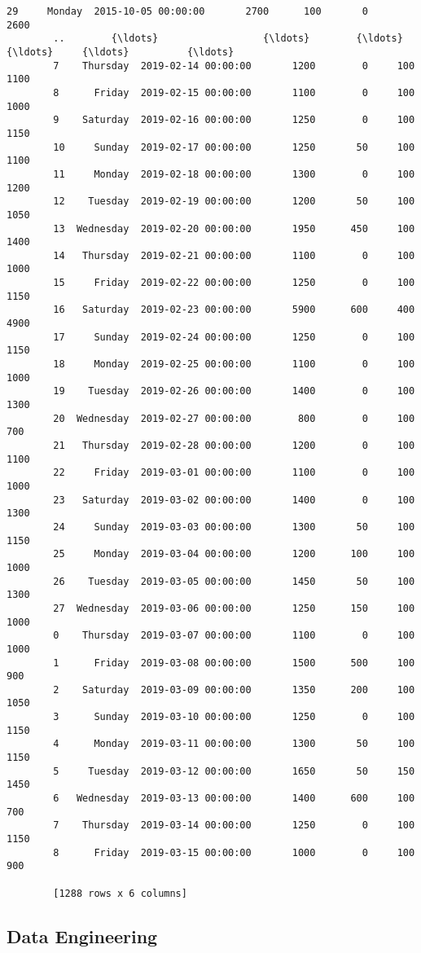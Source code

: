 \documentclass[11pt]{article}
\begin{document}
\begin{Verbatim}[commandchars=\\\{\}]
        29     Monday  2015-10-05 00:00:00       2700      100       0         2600
        ..        {\ldots}                  {\ldots}        {\ldots}      {\ldots}     {\ldots}          {\ldots}
        7    Thursday  2019-02-14 00:00:00       1200        0     100         1100
        8      Friday  2019-02-15 00:00:00       1100        0     100         1000
        9    Saturday  2019-02-16 00:00:00       1250        0     100         1150
        10     Sunday  2019-02-17 00:00:00       1250       50     100         1100
        11     Monday  2019-02-18 00:00:00       1300        0     100         1200
        12    Tuesday  2019-02-19 00:00:00       1200       50     100         1050
        13  Wednesday  2019-02-20 00:00:00       1950      450     100         1400
        14   Thursday  2019-02-21 00:00:00       1100        0     100         1000
        15     Friday  2019-02-22 00:00:00       1250        0     100         1150
        16   Saturday  2019-02-23 00:00:00       5900      600     400         4900
        17     Sunday  2019-02-24 00:00:00       1250        0     100         1150
        18     Monday  2019-02-25 00:00:00       1100        0     100         1000
        19    Tuesday  2019-02-26 00:00:00       1400        0     100         1300
        20  Wednesday  2019-02-27 00:00:00        800        0     100          700
        21   Thursday  2019-02-28 00:00:00       1200        0     100         1100
        22     Friday  2019-03-01 00:00:00       1100        0     100         1000
        23   Saturday  2019-03-02 00:00:00       1400        0     100         1300
        24     Sunday  2019-03-03 00:00:00       1300       50     100         1150
        25     Monday  2019-03-04 00:00:00       1200      100     100         1000
        26    Tuesday  2019-03-05 00:00:00       1450       50     100         1300
        27  Wednesday  2019-03-06 00:00:00       1250      150     100         1000
        0    Thursday  2019-03-07 00:00:00       1100        0     100         1000
        1      Friday  2019-03-08 00:00:00       1500      500     100          900
        2    Saturday  2019-03-09 00:00:00       1350      200     100         1050
        3      Sunday  2019-03-10 00:00:00       1250        0     100         1150
        4      Monday  2019-03-11 00:00:00       1300       50     100         1150
        5     Tuesday  2019-03-12 00:00:00       1650       50     150         1450
        6   Wednesday  2019-03-13 00:00:00       1400      600     100          700
        7    Thursday  2019-03-14 00:00:00       1250        0     100         1150
        8      Friday  2019-03-15 00:00:00       1000        0     100          900
        
        [1288 rows x 6 columns]
\end{Verbatim}
            
    \hypertarget{data-engineering}{%
\subsection{Data Engineering}\label{data-engineering}}


    
    
    
    
\end{document}
